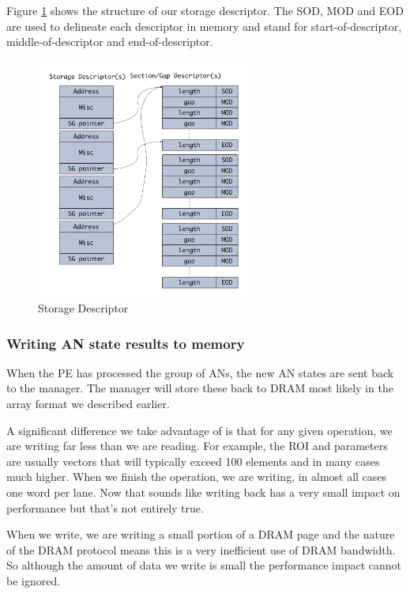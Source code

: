 \documentclass[journal]{IEEEtran}
\begin{document}
Figure \ref{fig:storageDescriptor} shows the structure of our storage descriptor. The SOD, MOD and EOD are used to delineate each descriptor in memory and stand for start-of-descriptor, middle-of-descriptor and end-of-descriptor.

\begin{figure}[!t]
\centerline{
\mbox{\includegraphics[width=2.75in]{storageDesc.jpg}}
}
\caption{Storage Descriptor}
\label{fig:storageDescriptor}
\end{figure}

\subsubsection{Writing AN state results to memory}
\label{ssec:writingANStates}

When the PE has processed the group of ANs, the new AN states are sent back to the manager. The manager will store these back to DRAM most likely in the array format we described earlier.

A significant difference we take advantage of is that for any given operation, we are writing far less than we are reading. For example, the ROI and parameters are usually vectors that will typically exceed 100 elements and in many cases much higher. When we finish the operation, we are writing, in almost all cases one word per lane. Now that sounds like writing back has a very small impact on performance but that's not entirely true.

When we write, we are writing a small portion of a DRAM page and the nature of the DRAM protocol means this is a very inefficient use of DRAM bandwidth. So although the amount of data we write is small the performance impact cannot be ignored.
\end{document}

